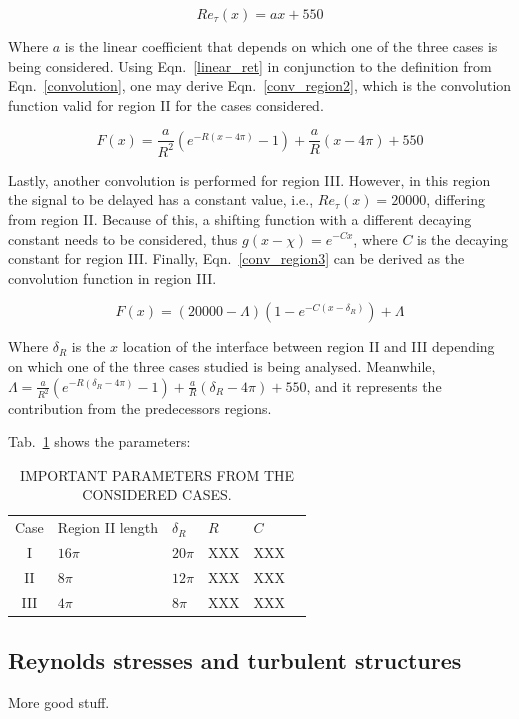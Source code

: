 \documentclass[twocolumn,10pt]{asme2e}
\begin{document}
\begin{equation}
Re_{\tau}(x)=ax+550
\label{linear_ret}
\end{equation}

Where \(a\) is the linear coefficient that depends on which one of the three cases is being considered. Using Eqn.~\ref{linear_ret} in conjunction to the definition from Eqn.~\ref{convolution}, one may derive Eqn.~\ref{conv_region2}, which is the convolution function valid for region II for the cases considered.

\begin{equation}
F(x)= \frac{a}{R^2}(e^{-R(x-4{\pi})}-1)+\frac{a}{R}(x-4{\pi})+550
\label{conv_region2}
\end{equation}

Lastly, another convolution is performed for region III. However, in this region the signal to be delayed has a constant value, i.e., \(Re_{\tau}(x)=20000\), differing from region II. Because of this, a shifting function with a different decaying constant needs to be considered, thus \(g(x-\chi)=e^{-Cx}\), where \(C\) is the decaying constant for region III. Finally, Eqn.~\ref{conv_region3} can be derived as the convolution function in region III.

\begin{equation}
F(x)= (20000-{\Lambda})(1-e^{-C(x-{\delta}_{R})})+{\Lambda}
\label{conv_region3}
\end{equation}

Where \({\delta}_{R}\) is the \(x\) location of the interface between region II and III depending on which one of the three cases studied is being analysed. Meanwhile, \({\Lambda}=\frac{a}{R^2}(e^{-R({\delta}_{R}-4{\pi})}-1)+\frac{a}{R}({\delta}_{R}-4{\pi})+550\), and it represents the contribution from the predecessors regions.

Tab.~\ref{table_conv} shows the parameters:

\begin{table}[t]
\caption{IMPORTANT PARAMETERS FROM THE CONSIDERED CASES.}
\begin{center}
\centering
\label{table_conv}
\begin{tabular}{c l l l l l}
& & & & \\ %
\hline
Case	&	Region II length	&	\({\delta}_R\)	&	\(R\)	&	\(C\) \\
\hline
I	&	        \(16{\pi}\)	&	\(20{\pi}\)	&	XXX	&	XXX \\
II	&	        \(8{\pi}\)		&	\(12{\pi}\)	&	XXX	&	XXX \\
III	&	        \(4{\pi}\)		&	\(8{\pi}\)	&	XXX	&	XXX \\
\hline
\end{tabular}
\end{center}
\end{table}

\subsection*{Reynolds stresses and turbulent structures}

More good stuff.





\appendix   
\end{document}

